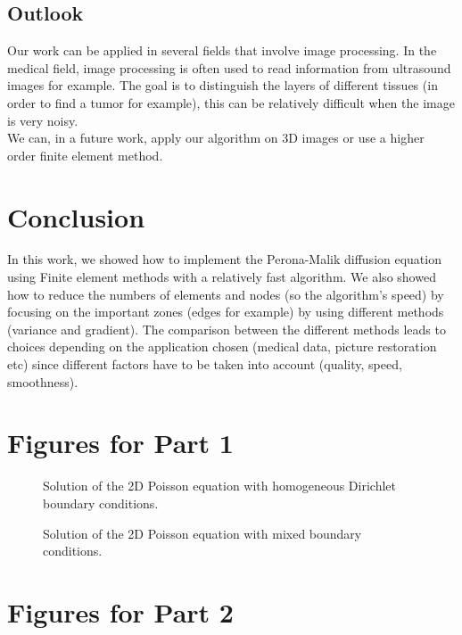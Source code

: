 \documentclass{report}
\begin{document}
\section{Outlook}

Our work can be applied in several fields that involve image processing. In the medical field, image processing is often used to read information from ultrasound images for example. The goal is to distinguish the layers of different tissues (in order to find a tumor for example), this can be relatively difficult when the image is very noisy. \\

We can, in a future work, apply our algorithm on 3D images or use a higher order finite element method. \\



\chapter{Conclusion}

In this work, we showed how to implement the Perona-Malik diffusion equation using Finite element methods with a relatively fast algorithm. We also showed how to reduce the numbers of elements and nodes (so the algorithm's speed) by focusing on the important zones (edges for example) by using different methods (variance and gradient). The comparison between the different methods leads to choices depending on the application chosen (medical data, picture restoration etc) since different factors have to be taken into account (quality, speed, smoothness). 



\appendix

\chapter{Figures for Part 1}

\begin{figure}
	\caption{Solution of the 2D Poisson equation with homogeneous Dirichlet boundary conditions.}
	\label{vis:2dpoissondir}
\end{figure}

\begin{figure}
	\caption{Solution of the 2D Poisson equation with mixed boundary conditions.}
	\label{vis:2dpoissonneu}
\end{figure}

\chapter{Figures for Part 2}
\end{document}
